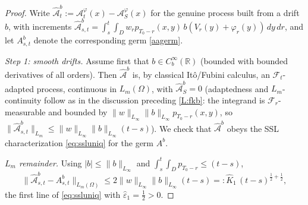 \documentclass[12pt]{article}
\theoremstyle{definition}
\DeclareMathOperator{\1}{\mathbbm{1}}%
\def\phi{\varphi}
\renewcommand{\le}{\leqslant}
\newcommand{\A}{\mathcal{A}}
\newcommand{\F}{\mathcal{F}}
\newcommand{\R}{\mathbb{R}}
\begin{document}
\begin{proof}
Write $\widehat{\mathcal A}^b_t:=\A^\phi_t(x)-\A^\phi_S(x)$ for the genuine process built from a
drift $b$, with increments
$\widehat{\mathcal A}^b_{s,t}=\int_s^t\int_D w_r p_{T_0-r}(x,y)\,b(V_r(y)+\phi_r(y))\,dy\,dr$,
and let $A^{b}_{s,t}$ denote the corresponding germ \eqref{aagerm}.

\emph{Step 1: smooth drifts.} Assume first that $b\in C_b^\infty(\R)$ (bounded with bounded
derivatives of all orders). Then $\widehat{\mathcal A}^b$ is, by classical It\^o/Fubini calculus, an
$\F_t$-adapted process, continuous in $L_m(\Omega)$, with $\widehat{\mathcal A}^b_S=0$
(adaptedness and $L_m$-continuity follow as in the discussion preceding \cref{L:fkb}: the
integrand is $\F_r$-measurable and bounded by $\|w\|_{L_\infty}\|b\|_{L_\infty}p_{T_0-r}(x,y)$,
so $\|\widehat{\mathcal A}^b_{s,t}\|_{L_m}\le\|w\|_{L_\infty}\|b\|_{L_\infty}(t-s)$). We check that
$\widehat{\mathcal A}^b$ obeys the SSL characterization \eqref{eq:ssluniq} for the germ $A^b$.

\emph{$L_m$ remainder.} Using $|b|\le\|b\|_{L_\infty}$ and $\int_s^t\int_D p_{T_0-r}\le(t-s)$,
\begin{equation}\label{eq:ident-Lm}
\|\widehat{\mathcal A}^b_{s,t}-A^b_{s,t}\|_{L_m(\Omega)}\le 2\|w\|_{L_\infty}\|b\|_{L_\infty}(t-s)
=:\widehat K_1\,(t-s)^{\frac12+\frac12},
\end{equation}
the first line of \eqref{eq:ssluniq} with $\widehat\varepsilon_1=\tfrac12>0$.


\end{proof}
\end{document}
